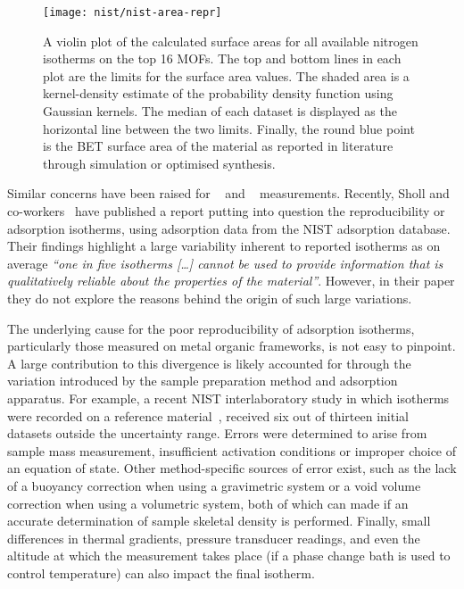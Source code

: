 \begin{figure}[tb]
	\centering
	\texttt{[image: nist/nist-area-repr]}%
	\caption{A violin plot of the calculated surface areas for
		all available nitrogen isotherms on the top 16 MOFs.
		The top and bottom lines in each plot are the limits for
		the surface area values. The shaded area is a kernel-density estimate
		of the probability density function using Gaussian kernels.
		The median of each dataset is displayed as the horizontal line
		between the two limits. Finally, the round blue point is the
		BET surface area of the material as reported in literature through
		simulation or optimised synthesis.}%
	\label{pyg:fgr:nist-area-repr}
\end{figure}

Similar concerns have been
raised for ~\cite{broomIrreproducibilityHydrogenStorage2016}
and ~\cite{espinalMeasurementStandardsData2013} measurements.
Recently, Sholl and co-workers~\cite{parkHowReproducibleAre2017}
have published a report putting into question the reproducibility
or adsorption isotherms, using  adsorption data from the
NIST adsorption database. Their findings highlight a large
variability inherent
to reported isotherms as on average \textit{``one in five 
	isotherms [\ldots] cannot be used to provide information that
	is qualitatively reliable about the properties of the material''}.
However, in their paper they do not explore the reasons behind the
origin of such large variations.

The underlying cause for the poor reproducibility of adsorption
isotherms, particularly those measured on metal organic frameworks,
is not easy to pinpoint. A large contribution to this divergence
is likely accounted for through the variation introduced by the
sample preparation method and adsorption apparatus.
For example, a recent NIST interlaboratory study in which 
isotherms were recorded on a reference
material~\cite{nguyenReferenceHighpressureCO22018}, received six
out of thirteen initial datasets outside the uncertainty range.
Errors were determined to arise from sample mass measurement,
insufficient activation conditions or improper choice of an
equation of state. Other method-specific sources of error exist,
such as the lack of a buoyancy correction when using a
gravimetric system or a void volume correction when using
a volumetric system, both of which can made if an accurate
determination of sample skeletal density is performed. Finally,
small differences in thermal gradients, pressure transducer
readings, and even the altitude at which the measurement takes place
(if a phase change bath is used to control temperature)
can also impact the final isotherm.

